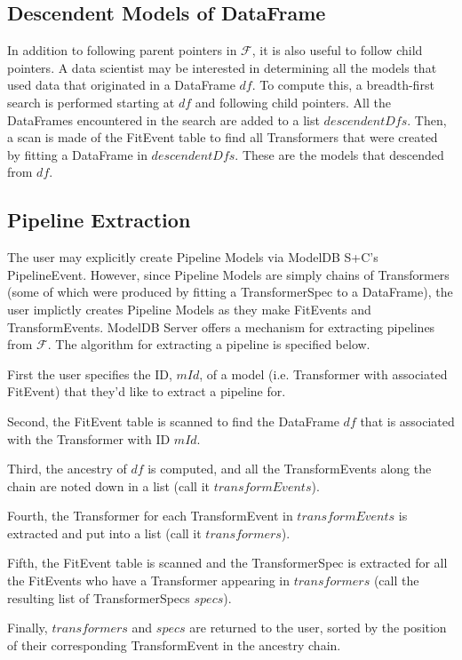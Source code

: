 \subsection{Descendent Models of DataFrame}
In addition to following parent pointers in $\mathcal{F}$, it is also useful to follow child pointers. A data scientist
may be interested in determining all the models that used data that originated in a DataFrame $df$. To compute this,
a breadth-first search is performed starting at $df$ and following child pointers. All the DataFrames encountered in 
the search are added to a list $descendentDfs$. Then, a scan is made of the FitEvent table to find all Transformers that
were created by fitting a DataFrame in $descendentDfs$. These are the models that descended from $df$.

\subsection{Pipeline Extraction}
The user may explicitly create Pipeline Models via ModelDB S+C's PipelineEvent. However, since Pipeline Models are 
simply chains of Transformers (some of which were produced by fitting a TransformerSpec to a DataFrame),
the user implictly creates Pipeline Models as they make FitEvents and TransformEvents. ModelDB Server offers a mechanism
for extracting pipelines from $\mathcal{F}$. The algorithm for extracting a pipeline is specified below.

First the user specifies the ID, $mId$, of a model (i.e. Transformer with associated FitEvent) that they'd like to extract
a pipeline for.

Second, the FitEvent table is scanned to find the DataFrame $df$ that is associated with the Transformer with ID $mId$.

Third, the ancestry of $df$ is computed, and all the TransformEvents along the chain are noted down in a list (call it $transformEvents$).

Fourth, the Transformer for each TransformEvent in $transformEvents$ is extracted and put into a list (call it $transformers$).

Fifth, the FitEvent table is scanned and the TransformerSpec is extracted for all the FitEvents who have a Transformer appearing in $transformers$ 
(call the resulting list of TransformerSpecs $specs$).

Finally, $transformers$ and $specs$ are returned to the user, sorted by the position of their corresponding TransformEvent in the ancestry chain.

